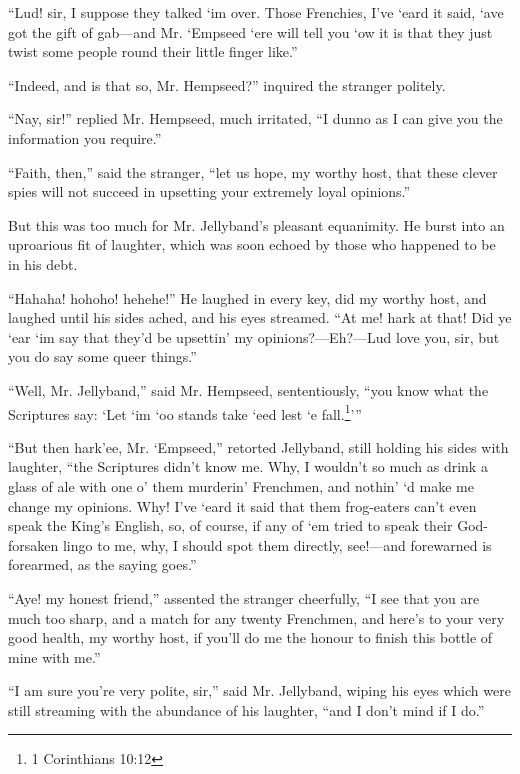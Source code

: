 \documentclass[paper=5.5in:8.5in,BCOR=7mm,twoside,DIV=calc,12pt,usegeometry,chapterprefix,endperiod,headings=big]{scrbook}
\begin{document}
\enquote{Lud! sir, I suppose they talked `im over. Those Frenchies, I've `eard it said, `ave got the gift of gab---and Mr. `Empseed `ere will tell you `ow it is that they just twist some people round their little finger like.}

\enquote{Indeed, and is that so, Mr. Hempseed?} inquired the stranger politely.

\enquote{Nay, sir!} replied Mr. Hempseed, much irritated, \enquote{I dunno as I can give you the information you require.}

\enquote{Faith, then,} said the stranger, \enquote{let us hope, my worthy host, that these clever spies will not succeed in upsetting your extremely loyal opinions.}

But this was too much for Mr. Jellyband's pleasant equanimity. He burst into an uproarious fit of laughter, which was soon echoed by those who happened to be in his debt.

\enquote{Hahaha! hohoho! hehehe!} He laughed in every key, did my worthy host, and laughed until his sides ached, and his eyes streamed. \enquote{At me! hark at that! Did ye `ear `im say that they'd be upsettin’ my opinions?---Eh?---Lud love you, sir, but you do say some queer things.}

\enquote{Well, Mr. Jellyband,} said Mr. Hempseed, sententiously, \enquote{you know what the Scriptures say: \enquote{Let `im `oo stands take `eed lest `e fall.\footnote{1 Corinthians 10:12}}}

\enquote{But then hark'ee, Mr. `Empseed,} retorted Jellyband, still holding his sides with laughter, \enquote{the Scriptures didn't know me. Why, I wouldn't so much as drink a glass of ale with one o’ them murderin’ Frenchmen, and nothin’ `d make me change my opinions. Why! I've `eard it said that them frog-eaters can't even speak the King's English, so, of course, if any of `em tried to speak their God-forsaken lingo to me, why, I should spot them directly, see!---and forewarned is forearmed, as the saying goes.}

\enquote{Aye! my honest friend,} assented the stranger cheerfully, \enquote{I see that you are much too sharp, and a match for any twenty Frenchmen, and here's to your very good health, my worthy host, if you'll do me the honour to finish this bottle of mine with me.}

\enquote{I am sure you're very polite, sir,} said Mr. Jellyband, wiping his eyes which were still streaming with the abundance of his laughter, \enquote{and I don't mind if I do.}
\end{document}
